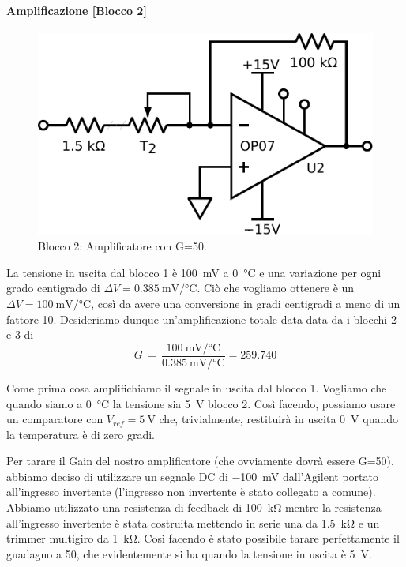 \paragraph{Amplificazione [Blocco 2]\newline}

\begin{figure}
\centering
\includegraphics[width=.3\textwidth]{../E06/latex/P2.pdf}
\caption{Blocco 2: Amplificatore con G=50.}
\label{cir6:2wire}
\end{figure}

La tensione in uscita dal blocco 1 è \SI{100}{\milli\volt} a \SI{0}{\celsius} e una variazione per ogni grado centigrado di $\Delta V=\SI{0.385}{\milli\volt}/\si{\celsius}$.
Ciò che vogliamo ottenere è un $\Delta V=\SI{100}{\milli\volt}/\si{\celsius}$, così da avere una conversione in gradi centigradi a meno di un fattore 10. %
Desideriamo dunque un'amplificazione totale data data da i blocchi 2 e 3 di
\vspace{-2mm}
$$G\,=\,\frac{\SI{100}{\milli\volt}/\si{\celsius}}{\SI{0.385}{\milli\volt}/\si{\celsius}}=\num{259.740}$$
\vspace{-4mm}

%
Come prima cosa amplifichiamo il segnale in uscita dal blocco 1.
Vogliamo che quando siamo a \SI{0}{\celsius} la tensione sia \SI{5}{\volt} blocco 2.
Così facendo, possiamo usare un comparatore con $V_{ref}=\SI{5}{\volt}$ che, trivialmente, restituirà in uscita \SI{0}{\volt} quando la temperatura è di zero gradi. 

Per tarare il Gain del nostro amplificatore (che ovviamente dovrà essere G=50), abbiamo deciso di utilizzare un segnale DC di \SI{-100}{\mV} dall'Agilent portato all'ingresso invertente (l'ingresso non invertente è stato collegato a comune).
Abbiamo utilizzato una resistenza di feedback di \SI{100}{\kilo\ohm} mentre la resistenza all'ingresso invertente è stata costruita mettendo in serie una da \SI{1.5}{\kilo\ohm} e un trimmer multigiro da \SI{1}{\kilo\ohm}.
Così facendo è stato possibile tarare perfettamente il guadagno a 50, che evidentemente si ha quando la tensione in uscita è \SI{5}{\volt}. 

